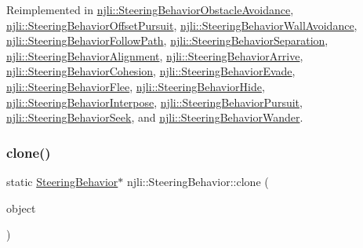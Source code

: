 Reimplemented in \mbox{\hyperlink{classnjli_1_1_steering_behavior_obstacle_avoidance_ac449ac3fda8bf254ce14238e3098a8d6}{njli\+::\+Steering\+Behavior\+Obstacle\+Avoidance}}, \mbox{\hyperlink{classnjli_1_1_steering_behavior_offset_pursuit_a1cf848834e750bb2a43bf2c4f2fde6d4}{njli\+::\+Steering\+Behavior\+Offset\+Pursuit}}, \mbox{\hyperlink{classnjli_1_1_steering_behavior_wall_avoidance_ae2c2f21709b8618e6bd984e00a982bdb}{njli\+::\+Steering\+Behavior\+Wall\+Avoidance}}, \mbox{\hyperlink{classnjli_1_1_steering_behavior_follow_path_af60b873d59ffb7c5e800e2511f942978}{njli\+::\+Steering\+Behavior\+Follow\+Path}}, \mbox{\hyperlink{classnjli_1_1_steering_behavior_separation_a48e1a87903d1827801778137043d52d8}{njli\+::\+Steering\+Behavior\+Separation}}, \mbox{\hyperlink{classnjli_1_1_steering_behavior_alignment_a2b500b0c7cdd4c9bdecb94897749e5bd}{njli\+::\+Steering\+Behavior\+Alignment}}, \mbox{\hyperlink{classnjli_1_1_steering_behavior_arrive_a35e76ca4d74688cd292034313bffe888}{njli\+::\+Steering\+Behavior\+Arrive}}, \mbox{\hyperlink{classnjli_1_1_steering_behavior_cohesion_ac7807575daa40083f0e1c648da155f93}{njli\+::\+Steering\+Behavior\+Cohesion}}, \mbox{\hyperlink{classnjli_1_1_steering_behavior_evade_a15ee5391ccc2506831c1f74888d0b225}{njli\+::\+Steering\+Behavior\+Evade}}, \mbox{\hyperlink{classnjli_1_1_steering_behavior_flee_af688735b88770ca7e986b4f1607d7300}{njli\+::\+Steering\+Behavior\+Flee}}, \mbox{\hyperlink{classnjli_1_1_steering_behavior_hide_abf96426826554e8c405a08e8a6ca07f6}{njli\+::\+Steering\+Behavior\+Hide}}, \mbox{\hyperlink{classnjli_1_1_steering_behavior_interpose_a8b2c4a1124d344441df7c79d75779d60}{njli\+::\+Steering\+Behavior\+Interpose}}, \mbox{\hyperlink{classnjli_1_1_steering_behavior_pursuit_a5aab9694bf662d9f1cd8ad242b66d954}{njli\+::\+Steering\+Behavior\+Pursuit}}, \mbox{\hyperlink{classnjli_1_1_steering_behavior_seek_aecc44b5c250eae468afe04cfbccf73a6}{njli\+::\+Steering\+Behavior\+Seek}}, and \mbox{\hyperlink{classnjli_1_1_steering_behavior_wander_a15f9d5931b6d72abb1305cb018edbd3a}{njli\+::\+Steering\+Behavior\+Wander}}.

\mbox{\label{classnjli_1_1_steering_behavior_a4b924a53f5289df64d24b88340601394}} 
\subsubsection{\texorpdfstring{clone()}{clone()}}
{\footnotesize\ttfamily static \mbox{\hyperlink{classnjli_1_1_steering_behavior}{Steering\+Behavior}}$\ast$ njli\+::\+Steering\+Behavior\+::clone (\begin{DoxyParamCaption}\item[{const \mbox{\hyperlink{classnjli_1_1_steering_behavior}{Steering\+Behavior}} \&}]{object }\end{DoxyParamCaption})\hspace{0.3cm}{\ttfamily [static]}}




